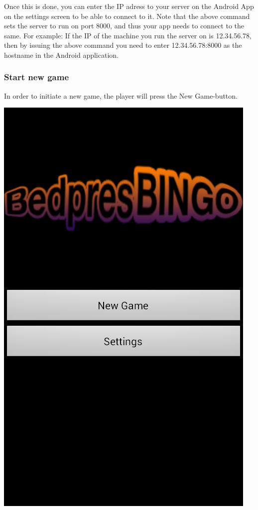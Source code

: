 Once this is done, you can enter the IP adress to your server on the Android App on the settings screen
to be able to connect to it. Note that the above command sets the server to run on port 8000,
and thus your app needs to connect to the same. For example: If the IP of the machine you run the server
on is 12.34.56.78, then by issuing the above command you need to enter 12.34.56.78:8000 as the hostname
in the Android application.

\subsubsection{Start new game}
In order to initiate a new game, the player will press the New Game-button.
\begin{center}
\includegraphics[scale=0.5]{Pikks/Mainmenu}
\end{center}

